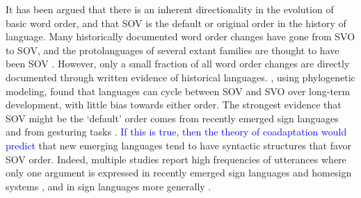 \documentclass[9pt,twocolumn,twoside,lineno]{pnas-new}
\begin{document}
It has been argued that there is an inherent directionality in the evolution of basic word order, and that SOV is the default or original order in the history of language.
Many historically documented word order changes have gone from SVO to SOV, and the protolanguages of several extant families are thought to have been SOV \citep{givon1979understanding, newmeyer2000evolutionary, maurits2014tracing}.
However, only a small fraction of all word order changes are directly documented through written evidence of historical languages. \cite{maurits2014tracing}, using phylogenetic modeling, found that languages can cycle between SOV and SVO over long-term development, with little bias towards either order.
The strongest evidence that SOV might be the `default' order comes from recently emerged sign languages \citep{senghas1997argument, sandler2005emergence, goldin-meadow1998spontaneous, meir2010emerging} and from gesturing tasks \citep{goldin-meadow2008natural, langus2010cognitive}.
\textcolor{blue}{If this is true, then the theory of coadaptation would predict} that new emerging languages tend to have syntactic structures that favor SOV order.
Indeed, multiple studies report high frequencies of utterances where only one argument is expressed in recently emerged sign languages and homesign systems \citep{sandler2005emergence, goldin-meadow1998spontaneous, neveu2016sign, ergin2018development}, and in sign languages more generally \citep{napoli2014order}.
\end{document}
